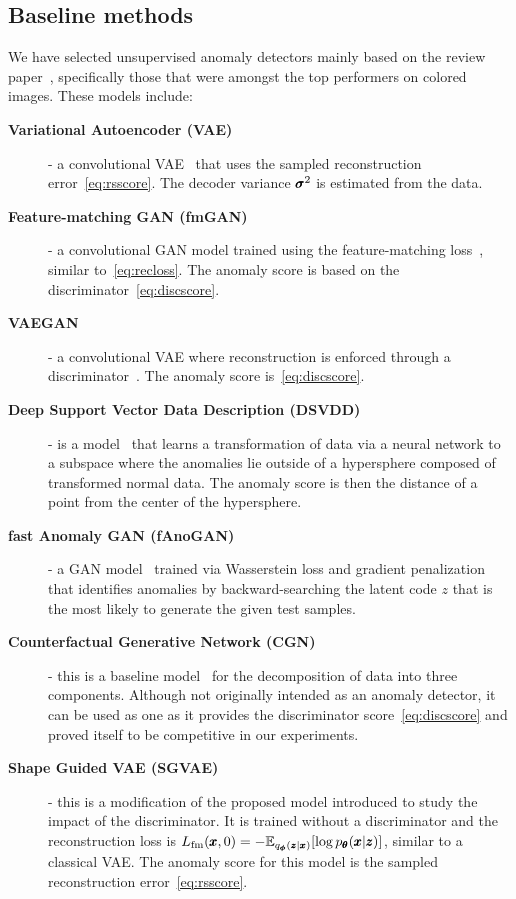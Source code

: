 \subsection{Baseline methods}
We have selected unsupervised anomaly detectors mainly based on the review paper~\cite{vskvara2021comparison}, specifically those that were amongst the top performers on colored images. These models include:

\begin{description}
    \item[\textbf{Variational Autoencoder (VAE)}] - a convolutional VAE~\cite{an2015variational, kingma2013vae} that uses the sampled reconstruction error~\eqref{eq:rsscore}. The decoder variance $\pmb{{\sigma}}^2$ is estimated from the data.
    \item[\textbf{Feature-matching GAN (fmGAN)}] - a convolutional GAN model trained using the feature-matching loss~\cite{salimans2016fmgan}, similar to~\eqref{eq:recloss}. The anomaly score is based on the discriminator~\eqref{eq:discscore}.
    \item[\textbf{VAEGAN}] - a  convolutional VAE where reconstruction is enforced through a discriminator~\cite{larsen2016autoencoding}. The anomaly score is~\eqref{eq:discscore}.
    \item[\textbf{Deep Support Vector Data Description (DSVDD)}] - is a model~\cite{ruff2018deep} that learns a transformation of data via a neural network to a subspace where the anomalies lie outside of a hypersphere composed of transformed normal data. The anomaly score is then the distance of a point from the center of the hypersphere.
    \item[\textbf{fast Anomaly GAN (fAnoGAN)}] - a GAN model~\cite{schleglFAnoGANFastUnsupervised2019} trained via Wasserstein loss and gradient penalization that identifies anomalies by backward-searching the latent code $z$ that is the most likely to generate the given test samples.
    \item[\textbf{Counterfactual Generative Network (CGN)}] - this is a baseline model~\cite{sauer2021counterfactual} for the decomposition of data into three components. Although not originally intended as an anomaly detector, it can be used as one as it provides the discriminator score~\eqref{eq:discscore} and proved itself to be competitive in our experiments.
    \item[\textbf{Shape Guided VAE (SGVAE)}] - this is a modification of the proposed model introduced to study the impact of the discriminator. It is trained without a discriminator and the reconstruction loss is $L_{\text{fm}}(\pmb{{x}},0) = -\mathbb{E}_{q_{\pmb{{\phi}}}(\pmb{{z}} \vert \pmb{{x}})}[\log p_{\pmb{{\theta}}}(\pmb{{x}} \vert \pmb{{z}})]$, similar to a classical VAE. The anomaly score for this model is the sampled reconstruction error~\eqref{eq:rsscore}.

\end{description}
